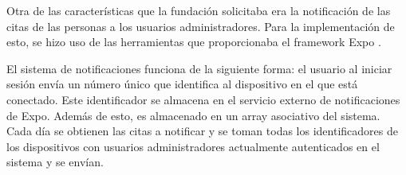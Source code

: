 Otra de las características que la fundación solicitaba era la notificación de las citas de las personas a los usuarios administradores. Para la implementación de esto, se hizo uso de las herramientas que proporcionaba el framework Expo \cite{expo-notifications}. 

El sistema de notificaciones funciona de la siguiente forma: el usuario al iniciar sesión envía un número único que identifica al dispositivo en el que está conectado. Este identificador se almacena en el servicio externo de notificaciones de Expo. Además de esto, es almacenado en un array asociativo del sistema. Cada día se obtienen las citas a notificar y se toman todas los identificadores de los dispositivos con usuarios administradores actualmente autenticados en el sistema y se envían. 
